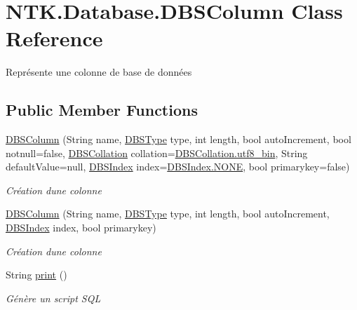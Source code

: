 \hypertarget{class_n_t_k_1_1_database_1_1_d_b_s_column}{}\section{N\+T\+K.\+Database.\+D\+B\+S\+Column Class Reference}
\label{class_n_t_k_1_1_database_1_1_d_b_s_column}


Représente une colonne de base de données  


\subsection*{Public Member Functions}
\begin{DoxyCompactItemize}
\item 
\mbox{\hyperlink{class_n_t_k_1_1_database_1_1_d_b_s_column_a0adbedece3d633d78591a19354037d9f}{D\+B\+S\+Column}} (String name, \mbox{\hyperlink{namespace_n_t_k_1_1_database_ae934a2911c3962eb3163e7e1758e8a01}{D\+B\+S\+Type}} type, int length, bool auto\+Increment, bool notnull=false, \mbox{\hyperlink{namespace_n_t_k_1_1_database_aa31c221c4926a0f02117557ca9883c03}{D\+B\+S\+Collation}} collation=\mbox{\hyperlink{namespace_n_t_k_1_1_database_aa31c221c4926a0f02117557ca9883c03a4fad0ebc37542e51064c07c063f2abc2}{D\+B\+S\+Collation.\+utf8\+\_\+bin}}, String default\+Value=null, \mbox{\hyperlink{namespace_n_t_k_1_1_database_a5c34332194d63089617b36a743a032ba}{D\+B\+S\+Index}} index=\mbox{\hyperlink{namespace_n_t_k_1_1_database_a5c34332194d63089617b36a743a032baab50339a10e1de285ac99d4c3990b8693}{D\+B\+S\+Index.\+N\+O\+NE}}, bool primarykey=false)
\begin{DoxyCompactList}\small\item\em Création d\textquotesingle{}une colonne \end{DoxyCompactList}\item 
\mbox{\hyperlink{class_n_t_k_1_1_database_1_1_d_b_s_column_a6751f83a70182da166d6c8801b6b3427}{D\+B\+S\+Column}} (String name, \mbox{\hyperlink{namespace_n_t_k_1_1_database_ae934a2911c3962eb3163e7e1758e8a01}{D\+B\+S\+Type}} type, int length, bool auto\+Increment, \mbox{\hyperlink{namespace_n_t_k_1_1_database_a5c34332194d63089617b36a743a032ba}{D\+B\+S\+Index}} index, bool primarykey)
\begin{DoxyCompactList}\small\item\em Création d\textquotesingle{}une colonne \end{DoxyCompactList}\item 
String \mbox{\hyperlink{class_n_t_k_1_1_database_1_1_d_b_s_column_a42b411e0186e607e3b8ad03ee75e4bbf}{print}} ()
\begin{DoxyCompactList}\small\item\em Génère un script S\+QL \end{DoxyCompactList}\end{DoxyCompactItemize}
